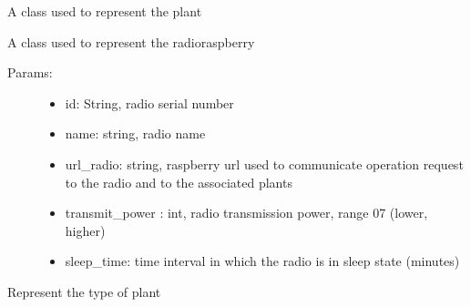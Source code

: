 \documentclass[letterpaper,10pt,english]{sphinxmanual}
\begin{document}

\begin{fulllineitems}
\label{\detokenize{index:model.gio_db.Plant}}
A class used to represent the plant

\end{fulllineitems}


\begin{fulllineitems}
\label{\detokenize{index:model.gio_db.Radio}}
A class used to represent the radio\sphinxhyphen{}raspberry
\begin{description}
\item[{Params:}] \leavevmode\begin{itemize}
\item {} 
id: String, radio serial number

\item {} 
name: string, radio name

\item {} 
url\_radio: string, raspberry url used to communicate operation request to the radio and to the associated plants

\item {} 
transmit\_power : int, radio transmission power, range 0\sphinxhyphen{}7 (lower, higher)

\item {} 
sleep\_time: time interval in which the radio is in sleep state (minutes)

\end{itemize}

\end{description}

\end{fulllineitems}


\begin{fulllineitems}
\label{\detokenize{index:model.gio_db.TypePlant}}
Represent the type of plant

\end{fulllineitems}
\end{document}
